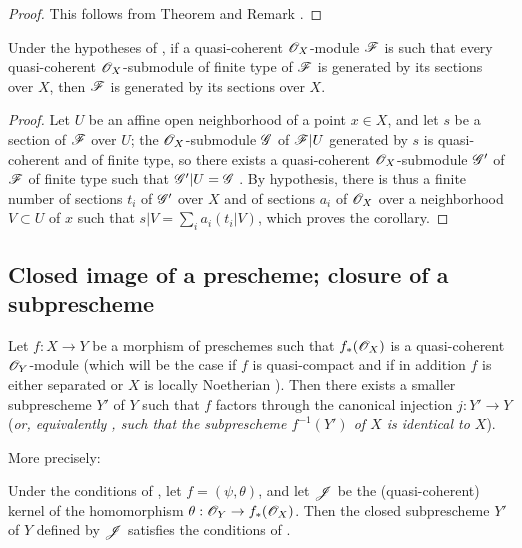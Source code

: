 \begin{proof}
\label{proof-1.9.4.9}
This follows from Theorem  and Remark .
\end{proof}

\begin{cor}[9.4.10]
\label{1.9.4.10}
Under the hypotheses of , if a quasi-coherent $\mathscr{O}_X$-module $\mathscr{F}$ is
such that every quasi-coherent $\mathscr{O}_X$-submodule of finite type of $\mathscr{F}$ is generated by
its sections over $X$, then $\mathscr{F}$ is generated by its sections over $X$.
\end{cor}

\begin{proof}
\label{proof-1.9.4.10}
Let $U$ be an affine open neighborhood of a point $x\in X$, and let $s$ be a
section of $\mathscr{F}$ over $U$; the $\mathscr{O}_X$-submodule $\mathscr{G}$ of $\mathscr{F}|U$ generated by $s$
is quasi-coherent and of finite type, so there exists a quasi-coherent $\mathscr{O}_X$-submodule
$\mathscr{G}'$ of $\mathscr{F}$ of finite type such that $\mathscr{G}'|U=\mathscr{G}$ . By
hypothesis, there is thus a finite number of sections $t_i$ of $\mathscr{G}'$ over $X$ and of
sections $a_i$ of $\mathscr{O}_X$ over a neighborhood $V\subset U$ of $x$ such that
$s|V=\sum_i a_i(t_i|V)$, which proves the corollary.
\end{proof}

\subsection{Closed image of a prescheme; closure of a subprescheme}
\label{subsection:closed-image-and-closure}

\begin{prop}[9.5.1]
\label{1.9.5.1}
Let $f:X\to Y$ be a morphism of preschemes such that $f_*(\mathscr{O}_X)$ is a quasi-coherent
$\mathscr{O}_Y$-module (which will be the case if $f$ is quasi-compact and if in addition $f$ is
either separated or $X$ is locally Noetherian ). Then there exists a smaller
subprescheme $Y'$ of $Y$ such that $f$ factors through the canonical injection $j:Y'\to Y$
(\emph{or, equivalently , such that the subprescheme $f^{-1}(Y')$ of $X$ is
\emph{identical} to $X$}).
\end{prop}

More precisely:
\begin{cor}[9.5.2]
\label{1.9.5.2}
Under the conditions of , let $f=(\psi,\theta)$, and let $\mathscr{J}$ be the
(quasi-coherent) kernel of the homomorphism $\theta:\OO_Y\to f_*(\OO_X)$. Then the closed
subprescheme $Y'$ of $Y$ defined by $\mathscr{J}$ satisfies the conditions of .
\end{cor}


